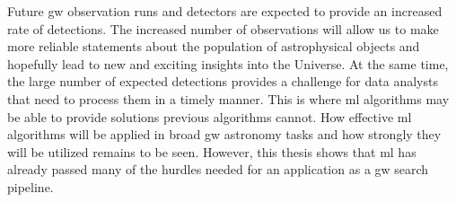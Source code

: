 Future \acrshort{gw} observation runs and detectors are expected to provide an increased rate of detections. The increased number of observations will allow us to make more reliable statements about the population of astrophysical objects and hopefully lead to new and exciting insights into the Universe. At the same time, the large number of expected detections provides a challenge for data analysts that need to process them in a timely manner. This is where \acrshort{ml} algorithms may be able to provide solutions previous algorithms cannot. How effective \acrshort{ml} algorithms will be applied in broad \acrshort{gw} astronomy tasks and how strongly they will be utilized remains to be seen. However, this thesis shows that \acrshort{ml} has already passed many of the hurdles needed for an application as a \acrshort{gw} search pipeline.
